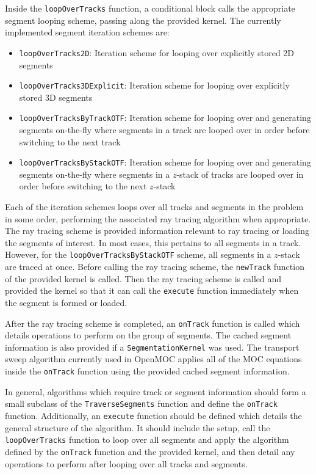 Inside the \texttt{loopOverTracks} function, a conditional block calls the appropriate segment looping scheme, passing along the provided kernel. The currently implemented segment iteration schemes are:
\begin{itemize}
	\item \texttt{loopOverTracks2D}: Iteration scheme for looping over explicitly stored 2D segments
	\item \texttt{loopOverTracks3DExplicit}: Iteration scheme for looping over explicitly stored 3D segments
	\item \texttt{loopOverTracksByTrackOTF}: Iteration scheme for looping over and generating segments on-the-fly where segments in a track are looped over in order before switching to the next track
	\item \texttt{loopOverTracksByStackOTF}: Iteration scheme for looping over and generating segments on-the-fly where segments in a $z$-stack of tracks are looped over in order before switching to the next $z$-stack
\end{itemize}
Each of the iteration schemes loops over all tracks and segments in the problem in some order, performing the associated ray tracing algorithm when appropriate. The ray tracing scheme is provided information relevant to ray tracing or loading the segments of interest. In most cases, this pertains to all segments in a track. However, for the \texttt{loopOverTracksByStackOTF} scheme, all segments in a $z$-stack are traced at once. Before calling the ray tracing scheme, the \texttt{newTrack} function of the provided kernel is called. Then the ray tracing scheme is called and provided the kernel so that it can call the \texttt{execute} function immediately when the segment is formed or loaded. 

After the ray tracing scheme is completed, an \texttt{onTrack} function is called which details operations to perform on the group of segments. The cached segment information is also provided if a \texttt{SegmentationKernel} was used. The transport sweep algorithm currently used in OpenMOC applies all of the \ac{MOC} equations inside the \texttt{onTrack} function using the provided cached segment information.

In general, algorithms which require track or segment information should form a small subclass of the \texttt{TraverseSegments} function and define the \texttt{onTrack} function. Additionally, an \texttt{execute} function should be defined which details the general structure of the algorithm. It should include the setup, call the \texttt{loopOverTracks} function to loop over all segments and apply the algorithm defined by the \texttt{onTrack} function and the provided kernel, and then detail any operations to perform after looping over all tracks and segments. 

